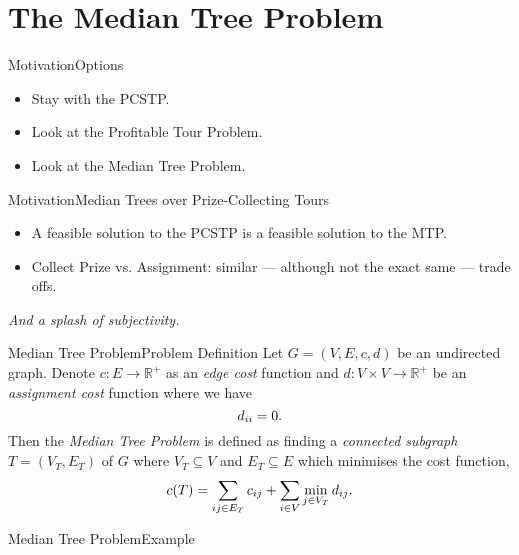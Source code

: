 \documentclass[rgb,dvipsnames]{beamer}
\newcommand{\RR}{\mathbb{R}}      %
\begin{document}
\section{The Median Tree Problem}
\begin{frame}{Motivation}{Options}
  \begin{itemize}
  \item Stay with the PCSTP.
  \item Look at the Profitable Tour Problem.
  \item Look at the Median Tree Problem.
  \end{itemize}
\end{frame}
\begin{frame}{Motivation}{Median Trees over Prize-Collecting Tours}
  \begin{itemize}
  \item A feasible solution to the PCSTP is a feasible solution to the MTP.
  \item Collect Prize vs. Assignment: similar --- although not the exact same --- trade offs.
  \end{itemize}
  \pause
 \textit{And a splash of subjectivity.}
\end{frame}
\begin{frame}{Median Tree Problem}{Problem Definition}
  Let $G = (V, E, c, d)$ be an undirected graph. Denote $c : E \to \RR^+$ as an \textit{edge cost} function
and $d : V \times V  \to \RR^+$ be an \textit{assignment cost} function where we have
\[d_{ii} = 0 \mathnormal{.}\]
Then the \textit{Median Tree Problem}
is defined as finding a \textit{connected subgraph} $T = (V_T, E_T)$ of $G$
where $V_T \subseteq V$ and
$E_T \subseteq E$ which minimises the cost function,
\[c(T) = \sum_{ij \in E_T} c_{ij} + \sum_{i \in V} \min_{j \in V_T} d_{ij}\mathnormal{.}\]
\end{frame}

\begin{frame}{Median Tree Problem}{Example}
  \centering

\end{frame}
\end{document}
